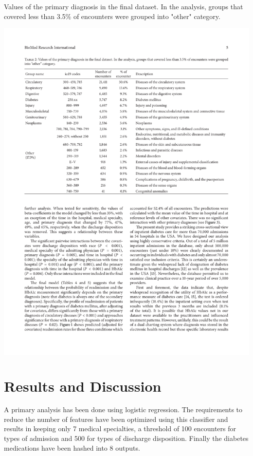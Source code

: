 \documentclass[12pt]{article}
\begin{document}
\begin{table}[t!]
   \centering
    \caption{\small Values of the primary diagnosis in the final dataset. In the analysis, groups that covered less than 3.5$\%$ of encounters were grouped into "other" category.}
    \vspace{0.2cm}
    \includegraphics[width=15cm]{diag.pdf}
    \label{diag}
\end{table}

\section{Results and Discussion}

A primary analysis has been done using logistic regression. The requirements to reduce the number of features have been optimized using this classifier and results in keeping only 7 medical specialties, a threshold of 100 encounters for types of admission and 500 for types of discharge disposition. Finally the diabetes medications have been hashed into 8 outputs.
\end{document}
